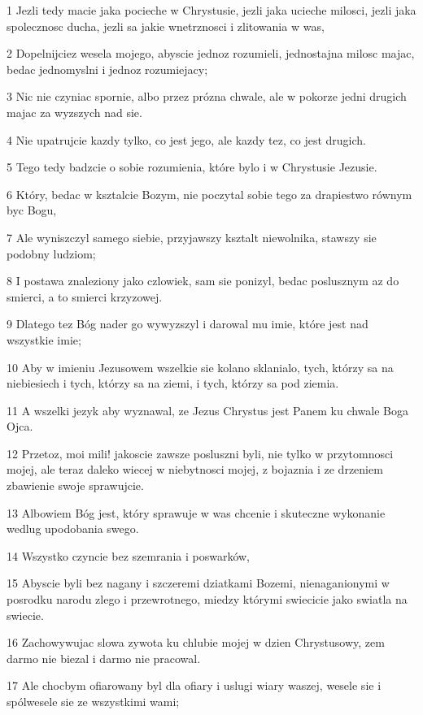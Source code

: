 \par 1 Jezli tedy macie jaka pocieche w Chrystusie, jezli jaka ucieche milosci, jezli jaka spolecznosc ducha, jezli sa jakie wnetrznosci i zlitowania w was,
\par 2 Dopelnijciez wesela mojego, abyscie jednoz rozumieli, jednostajna milosc majac, bedac jednomyslni i jednoz rozumiejacy;
\par 3 Nic nie czyniac spornie, albo przez prózna chwale, ale w pokorze jedni drugich majac za wyzszych nad sie.
\par 4 Nie upatrujcie kazdy tylko, co jest jego, ale kazdy tez, co jest drugich.
\par 5 Tego tedy badzcie o sobie rozumienia, które bylo i w Chrystusie Jezusie.
\par 6 Który, bedac w ksztalcie Bozym, nie poczytal sobie tego za drapiestwo równym byc Bogu,
\par 7 Ale wyniszczyl samego siebie, przyjawszy ksztalt niewolnika, stawszy sie podobny ludziom;
\par 8 I postawa znaleziony jako czlowiek, sam sie ponizyl, bedac poslusznym az do smierci, a to smierci krzyzowej.
\par 9 Dlatego tez Bóg nader go wywyzszyl i darowal mu imie, które jest nad wszystkie imie;
\par 10 Aby w imieniu Jezusowem wszelkie sie kolano sklanialo, tych, którzy sa na niebiesiech i tych, którzy sa na ziemi, i tych, którzy sa pod ziemia.
\par 11 A wszelki jezyk aby wyznawal, ze Jezus Chrystus jest Panem ku chwale Boga Ojca.
\par 12 Przetoz, moi mili! jakoscie zawsze posluszni byli, nie tylko w przytomnosci mojej, ale teraz daleko wiecej w niebytnosci mojej, z bojaznia i ze drzeniem zbawienie swoje sprawujcie.
\par 13 Albowiem Bóg jest, który sprawuje w was chcenie i skuteczne wykonanie wedlug upodobania swego.
\par 14 Wszystko czyncie bez szemrania i poswarków,
\par 15 Abyscie byli bez nagany i szczeremi dziatkami Bozemi, nienaganionymi w posrodku narodu zlego i przewrotnego, miedzy którymi swiecicie jako swiatla na swiecie.
\par 16 Zachowywujac slowa zywota ku chlubie mojej w dzien Chrystusowy, zem darmo nie biezal i darmo nie pracowal.
\par 17 Ale chocbym ofiarowany byl dla ofiary i uslugi wiary waszej, wesele sie i spólwesele sie ze wszystkimi wami;
